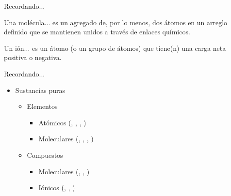 \documentclass{beamer}
\begin{document}
  \begin{frame}{Recordando...}
    \begin{block}{Una molécula...}
      es un agregado de, por lo menos, dos átomos en un arreglo definido que se mantienen unidos a través de enlaces químicos.
    \end{block}
    \begin{block}{Un ión...}
      es un átomo (o un grupo de átomos) que tiene(n) una carga neta positiva o negativa.
    \end{block}
  \end{frame}
  \begin{frame}{Recordando...}
    \begin{itemize}
      \item Sustancias puras
      \begin{itemize}
        \item Elementos
        \begin{itemize}
          \item Atómicos (, , , )
          \item Moleculares (, , , )
        \end{itemize}
        \item Compuestos
        \begin{itemize}
          \item Moleculares (, , )
          \item Iónicos (, , )
        \end{itemize}
      \end{itemize}
    \end{itemize}
  \end{frame}
\end{document}
